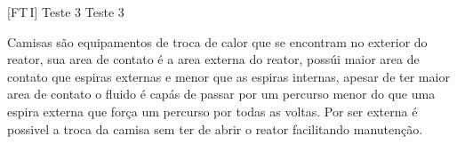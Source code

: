 \documentclass[\mainfilename]{subfiles}
\begin{document}
[FT\,I]
{Teste 3} %
{Teste 3} %


\begin{questionBox}{ %
} %
    Camisas são equipamentos de troca de calor que se encontram no exterior do reator, sua area de contato é a area externa do reator, possúi maior area de contato que espiras externas e menor que as espiras internas, apesar de ter maior area de contato o fluido é capás de passar por um percurso menor do que uma espira externa que força um percurso por todas as voltas.
    Por ser externa é possivel a troca da camisa sem ter de abrir o reator facilitando manutenção.
\end{questionBox}

\end{document}
